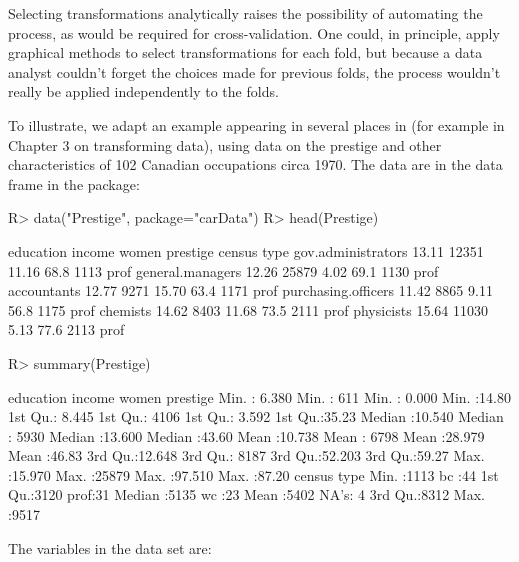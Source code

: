 \documentclass[
]{jss}
\begin{document}
Selecting transformations analytically raises the possibility of
automating the process, as would be required for cross-validation. One
could, in principle, apply graphical methods to select transformations
for each fold, but because a data analyst couldn't forget the choices
made for previous folds, the process wouldn't really be applied
independently to the folds.

To illustrate, we adapt an example appearing in several places in
\citet{FoxWeisberg:2019} (for example in Chapter 3 on transforming
data), using data on the prestige and other characteristics of 102
Canadian occupations circa 1970. The data are in the 
data frame in the  package:

\begin{CodeChunk}
\begin{CodeInput}
R> data("Prestige", package="carData")
R> head(Prestige)
\end{CodeInput}
\begin{CodeOutput}
                    education income women prestige census type
gov.administrators      13.11  12351 11.16     68.8   1113 prof
general.managers        12.26  25879  4.02     69.1   1130 prof
accountants             12.77   9271 15.70     63.4   1171 prof
purchasing.officers     11.42   8865  9.11     56.8   1175 prof
chemists                14.62   8403 11.68     73.5   2111 prof
physicists              15.64  11030  5.13     77.6   2113 prof
\end{CodeOutput}
\begin{CodeInput}
R> summary(Prestige)
\end{CodeInput}
\begin{CodeOutput}
   education          income          women           prestige    
 Min.   : 6.380   Min.   :  611   Min.   : 0.000   Min.   :14.80  
 1st Qu.: 8.445   1st Qu.: 4106   1st Qu.: 3.592   1st Qu.:35.23  
 Median :10.540   Median : 5930   Median :13.600   Median :43.60  
 Mean   :10.738   Mean   : 6798   Mean   :28.979   Mean   :46.83  
 3rd Qu.:12.648   3rd Qu.: 8187   3rd Qu.:52.203   3rd Qu.:59.27  
 Max.   :15.970   Max.   :25879   Max.   :97.510   Max.   :87.20  
     census       type   
 Min.   :1113   bc  :44  
 1st Qu.:3120   prof:31  
 Median :5135   wc  :23  
 Mean   :5402   NA's: 4  
 3rd Qu.:8312            
 Max.   :9517            
\end{CodeOutput}
\end{CodeChunk}

The variables in the  data set are:
\end{document}
